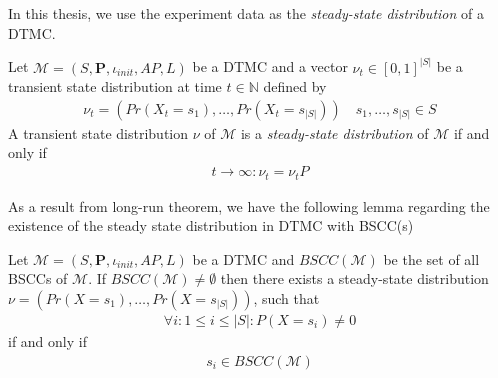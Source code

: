 \noindent In this thesis, we use the experiment data as the \textit{steady-state distribution} of a
DTMC.
\begin{theorem}
      \rm
      Let $\mathcal{M}=(S,\mathbf{P}, \iota_{init}, AP,L)$ be a DTMC and a vector $\nu_t \in
            [0,1]^{|S|}$ be a transient state distribution at time $t\in\mathbb{N}$ defined by
      \begin{align*}
            \nu_t = (Pr(X_t=s_1),\ldots,Pr(X_t=s_{|S|})) \quad s_1,\ldots,s_{|S|} \in S
      \end{align*}
      A transient state distribution $\nu$ of $\mathcal{M}$ is a \textit{steady-state distribution}
      of $\mathcal{M}$ if and only if
      \begin{align*}
            t\rightarrow \infty: \nu_t = \nu_t P
      \end{align*}
\end{theorem}
\noindent As a result from long-run theorem, we have the following lemma regarding the existence of
the steady state distribution in DTMC with BSCC(s)
\begin{lemma}[]
      \rm
      Let $\mathcal{M}=(S,\mathbf{P}, \iota_{init}, AP,L)$ be a DTMC and $BSCC(\mathcal{M})$ be the
      set of all BSCCs of $\mathcal{M}$. If $BSCC(\mathcal{M})\neq \emptyset$ then there exists a
      steady-state distribution $\nu = (Pr(X=s_1),\ldots,Pr(X=s_{|S|}))$, such that
      \begin{align*}
            \forall i: 1 \leq i \leq |S|: P(X=s_i) \neq 0
      \end{align*}
      if and only if
      \begin{align*}
            s_i \in BSCC(\mathcal{M})
      \end{align*}
\end{lemma}


